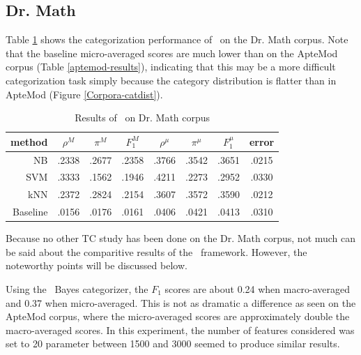 \subsection{Dr. Math}

Table \ref{drmath-results} shows the categorization performance of
\aicat\ on the Dr. Math corpus.  Note that the baseline micro-averaged
scores are much lower than on the ApteMod corpus (Table
\ref{aptemod-results}), indicating that this may be a more difficult
categorization task simply because the category distribution is
flatter than in ApteMod (Figure \ref{Corpora-catdist}).


\begin{table}
\begin{center}
\begin{tabular}{|r c c c c c c c|}
\hline
method    & $\rho^M$ & $\pi^M$ & $F_1^M$ & $\rho^\mu$ & $\pi^\mu$ & $F_1^\mu$ &   error \\
\hline
NB        &   .2338  &  .2677  &  .2358  &  .3766     &  .3542    &  .3651    &  .0215  \\
SVM       &   .3333  &  .1562  &  .1946  &  .4211     &  .2273    &  .2952    &  .0330  \\
kNN       &   .2372  &  .2824  &  .2154  &  .3607     &  .3572    &  .3590    &  .0212  \\
Baseline  &   .0156  &  .0176  &  .0161  &  .0406     &  .0421    &  .0413    &  .0310  \\
\hline
\end{tabular}
\end{center}
\caption{Results of \aicat\ on Dr. Math corpus}
\label{drmath-results}
\end{table}

Because no other TC study has been done on the Dr. Math corpus, not
much can be said about the comparitive results of the \aicat\
framework.  However, the noteworthy points will be discussed below.

Using the \naive\ Bayes categorizer, the $F_1$ scores are about 0.24
when macro-averaged and 0.37 when micro-averaged.  This is not as
dramatic a difference as seen on the ApteMod corpus, where the
micro-averaged scores are approximately double the macro-averaged
scores.  In this experiment, the number of features considered was set
to 20%
parameter between 1500 and 3000 seemed to produce similar results.

